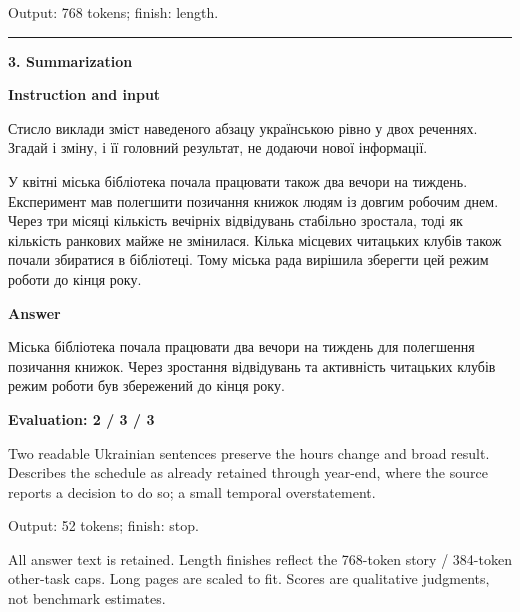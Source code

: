 \documentclass[10pt]{article}
\begin{document}
{\begin{minipage}{\textwidth}
\par {\color{gray} Output: 768 tokens; finish: length.}\par
\medskip\hrule\smallskip
{\bfseries 3. Summarization}\par\smallskip
\textbf{Instruction and input}\par Стисло виклади зміст наведеного абзацу українською рівно у двох реченнях. Згадай і зміну, і її головний результат, не додаючи нової інформації.
\par\smallskip
У квітні міська бібліотека почала працювати також два вечори на тиждень. Експеримент мав полегшити позичання книжок людям із довгим робочим днем. Через три місяці кількість вечірніх відвідувань стабільно зростала, тоді як кількість ранкових майже не змінилася. Кілька місцевих читацьких клубів також почали збиратися в бібліотеці. Тому міська рада вирішила зберегти цей режим роботи до кінця року.\par\smallskip
\textbf{Answer}\par Міська бібліотека почала працювати два вечори на тиждень для полегшення позичання книжок. Через зростання відвідувань та активність читацьких клубів режим роботи був збережений до кінця року.\par\smallskip
\textbf{Evaluation: 2 / 3 / 3}\par Two readable Ukrainian sentences preserve the hours change and broad result. Describes the schedule as already retained through year-end, where the source reports a decision to do so; a small temporal overstatement.
\par {\color{gray} Output: 52 tokens; finish: stop.}\par
\medskip\footnotesize All answer text is retained. Length finishes reflect the 768-token story / 384-token other-task caps. Long pages are scaled to fit. Scores are qualitative judgments, not benchmark estimates.
\end{minipage}}%
\noindent\ifdim\dimexpr\ht\languagepage+\dp\languagepage\relax>0.93\textheight%
\resizebox*{!}{0.93\textheight}{\usebox{\languagepage}}%
\else\usebox{\languagepage}\fi%
\end{document}
